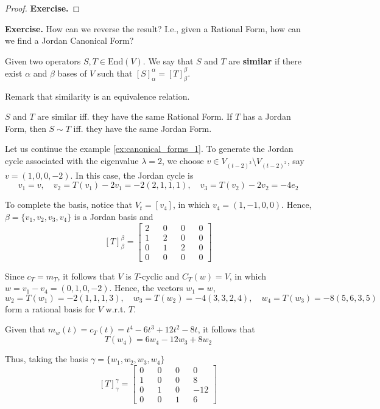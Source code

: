 \begin{proof}
	\textbf{Exercise.}
\end{proof}

\textbf{Exercise.} How can we reverse the result? I.e., given a Rational Form, how can we find a Jordan Canonical Form?

\begin{definition}
	Given two operators $S, T \in \text{End}(V)$. We say that $S$ and $T$ are \textbf{similar} if there exist $\alpha$ and $\beta$ bases of $V$ such that $[S]_\alpha^\alpha = [T]_\beta^\beta$.
\end{definition}

Remark that similarity is an equivalence relation.

\begin{theorem}
	$S$ and $T$ are similar iff. they have the same Rational Form. If $T$ has a Jordan Form, then $S \sim T$ iff. they have the same Jordan Form.
\end{theorem}

\begin{example}
	Let us continue the example \ref{ex:canonical_forms_1}. To generate the Jordan cycle associated with the eigenvalue $\lambda = 2$, we choose $v \in V_{(t-2)^3} \setminus V_{(t-2)^2}$, say $v = (1, 0, 0, -2)$. In this case, the Jordan cycle is
	\[
		v_1 = v, \quad v_2 = T(v_1) - 2v_1 = -2(2,1,1,1), \quad v_3 = T(v_2) - 2v_2 = -4 e_2
	\]
	
	To complete the basis, notice that $V_t = [v_4]$, in which $v_4 = (1, -1, 0, 0)$. Hence, $\beta = \{ v_1, v_2, v_3, v_4 \}$ is a Jordan basis and 
	\[
		[T]_\beta^\beta = \begin{bmatrix}
			2 && 0 && 0 && 0 \\
			1 && 2 && 0 && 0 \\
			0 && 1 && 2 && 0 \\
			0 && 0 && 0 && 0
		\end{bmatrix}
	\]
	
	Since $c_T = m_T$, it follows that $V$ is $T$-cyclic and $C_T(w) = V$, in which $w = v_1 - v_4 = (0, 1, 0, -2)$. Hence, the vectors $w_1 = w$,
	\[
		w_2 = T(w_1) = -2(1,1,1,3), \quad w_3 = T(w_2) = -4(3,3,2,4), \quad w_4 = T(w_3) = -8(5,6,3,5)
	\]
	form a rational basis for $V$ w.r.t. $T$.
	
	Given that $m_w(t) = c_T(t) = t^4 - 6t^3 + 12t^2 -8t$, it follows that
	\[
		T(w_4) = 6w_4 - 12 w_3 + 8 w_2
	\]
	
	Thus, taking the basis $\gamma = \{ w_1, w_2, w_3, w_4 \}$
	\[
		[T]_\gamma^\gamma = \begin{bmatrix}
			0 && 0 && 0 && 0 \\
			1 && 0 && 0 && 8 \\
			0 && 1 && 0 && -12 \\
			0 && 0 && 1 && 6
		\end{bmatrix}
	\]
\end{example}

